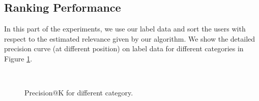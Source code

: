 \documentclass{article}
\begin{document}
\subsection{Ranking Performance}
In this part of the experiments, we use our label data and sort the users with respect to the estimated relevance given by our algorithm. We show the detailed precision curve (at different position) on label data for different categories in Figure \ref{fig:e1}.

\begin{figure}[h]
\centering
{}
\\
\caption{Precision@K for different category.}
\label{fig:e1}
\end{figure}
\end{document}
